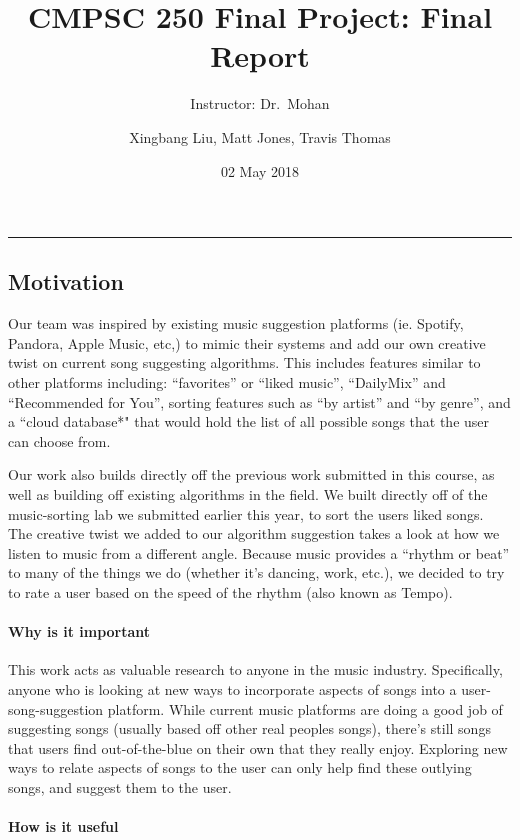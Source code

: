 \documentclass[]{article}
\title{CMPSC 250 Final Project: Final Report}
\subtitle{Instructor: Dr.~Mohan}
\author{Xingbang Liu, Matt Jones, Travis Thomas}
\date{02 May 2018}
\let\oldparagraph\paragraph
\renewcommand{\paragraph}[1]{\oldparagraph{#1}\mbox{}}
\begin{document}
\maketitle

\begin{center}\rule{0.5\linewidth}{\linethickness}\end{center}

\subsection{Motivation}\label{motivation}

Our team was inspired by existing music suggestion platforms (ie.
Spotify, Pandora, Apple Music, etc,) to mimic their systems and add our
own creative twist on current song suggesting algorithms. This includes
features similar to other platforms including: ``favorites'' or ``liked
music'', ``DailyMix'' and ``Recommended for You'', sorting features such
as ``by artist'' and ``by genre'', and a ``cloud database*" that would
hold the list of all possible songs that the user can choose from.

Our work also builds directly off the previous work submitted in this
course, as well as building off existing algorithms in the field. We
built directly off of the music-sorting lab we submitted earlier this
year, to sort the users liked songs. The creative twist we added to our
algorithm suggestion takes a look at how we listen to music from a
different angle. Because music provides a ``rhythm or beat'' to many of
the things we do (whether it's dancing, work, etc.), we decided to try
to rate a user based on the speed of the rhythm (also known as Tempo).

\paragraph{Why is it important}\label{why-is-it-important}

This work acts as valuable research to anyone in the music industry.
Specifically, anyone who is looking at new ways to incorporate aspects
of songs into a user-song-suggestion platform. While current music
platforms are doing a good job of suggesting songs (usually based off
other real peoples songs), there's still songs that users find
out-of-the-blue on their own that they really enjoy. Exploring new ways
to relate aspects of songs to the user can only help find these outlying
songs, and suggest them to the user.

\paragraph{How is it useful}\label{how-is-it-useful}
\end{document}
